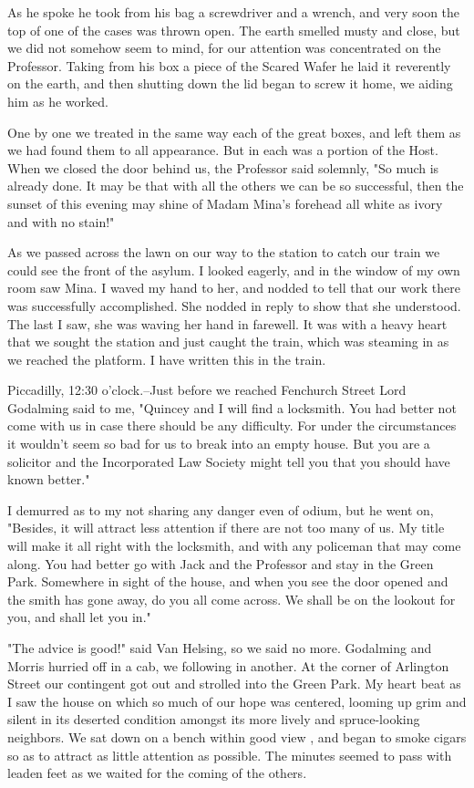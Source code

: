 As he spoke he took from his bag a screwdriver and a wrench, and very soon the top of one of the cases was thrown open. The earth smelled musty and close, but we did not somehow seem to mind, for our attention was concentrated on the Professor. Taking from his box a piece of the Scared Wafer he laid it reverently on the earth, and then shutting down the lid began to screw it home, we aiding him as he worked. 

One by one we treated in the same way each of the great boxes, and left them as we had found them to all appearance. But in each was a portion of the Host. When we closed the door behind us, the Professor said solemnly, "So much is already done. It may be that with all the others we can be so successful, then the sunset of this evening may shine of Madam Mina's forehead all white as ivory and with no stain!" 

As we passed across the lawn on our way to the station to catch our train we could see the front of the asylum. I looked eagerly, and in the window of my own room saw Mina. I waved my hand to her, and nodded to tell that our work there was successfully accomplished. She nodded in reply to show that she understood. The last I saw, she was waving her hand in farewell. It was with a heavy heart that we sought the station and just caught the train, which was steaming in as we reached the platform. I have written this in the train. 

Piccadilly, 12:30 o'clock.--Just before we reached Fenchurch Street Lord Godalming said to me, "Quincey and I will find a locksmith. You had better not come with us in case there should be any difficulty. For under the circumstances it wouldn't seem so bad for us to break into an empty house. But you are a solicitor and the Incorporated Law Society might tell you that you should have known better." 

I demurred as to my not sharing any danger even of odium, but he went on, "Besides, it will attract less attention if there are not too many of us. My title will make it all right with the locksmith, and with any policeman that may come along. You had better go with Jack and the Professor and stay in the Green Park. Somewhere in sight of the house, and when you see the door opened and the smith has gone away, do you all come across. We shall be on the lookout for you, and shall let you in." 

"The advice is good!" said Van Helsing, so we said no more. Godalming and Morris hurried off in a cab, we following in another. At the corner of Arlington Street our contingent got out and strolled into the Green Park. My heart beat as I saw the house on which so much of our hope was centered, looming up grim and silent in its deserted condition amongst its more lively and spruce-looking neighbors. We sat down on a bench within good view , and began to smoke cigars so as to attract as little attention as possible. The minutes seemed to pass with leaden feet as we waited for the coming of the others. 


